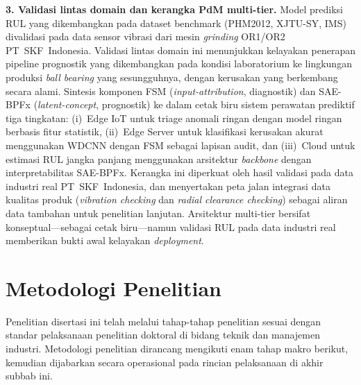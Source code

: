 \textbf{3. {\color{blue}Validasi lintas domain dan kerangka PdM multi-tier.}}
{\color{blue}Model prediksi RUL yang dikembangkan pada dataset benchmark
(PHM2012, XJTU-SY, IMS) divalidasi pada data sensor vibrasi dari mesin
\emph{grinding} OR1/OR2 PT~SKF~Indonesia.
Validasi lintas domain ini menunjukkan kelayakan penerapan pipeline prognostik
yang dikembangkan pada kondisi laboratorium ke lingkungan produksi
\emph{ball bearing} yang sesungguhnya, dengan kerusakan yang berkembang
secara alami.}
Sintesis komponen FSM (\emph{input-attribution}, {\color{blue}diagnostik}) dan SAE-BPFx
(\emph{latent-concept}, {\color{blue}prognostik}) ke dalam cetak biru sistem perawatan
prediktif tiga tingkatan: (i)~Edge IoT untuk triage anomali ringan dengan
model ringan berbasis fitur statistik, (ii)~Edge Server untuk klasifikasi
kerusakan akurat menggunakan WDCNN dengan FSM sebagai lapisan audit, dan
(iii)~Cloud untuk estimasi RUL jangka panjang menggunakan arsitektur
\emph{backbone} dengan interpretabilitas SAE-BPFx.
{\color{blue}Kerangka ini diperkuat oleh hasil validasi pada data
industri real PT~SKF~Indonesia, dan menyertakan peta jalan integrasi data
kualitas produk (\emph{vibration checking} dan \emph{radial clearance
checking}) sebagai aliran data tambahan untuk penelitian lanjutan.}
Arsitektur multi-tier bersifat konseptual---sebagai cetak biru---namun
validasi RUL pada data industri real memberikan bukti awal kelayakan
\emph{deployment}.


\section{Metodologi Penelitian}
\label{sec:bab1_metodologi}

Penelitian disertasi ini telah melalui tahap-tahap penelitian sesuai
dengan standar pelaksanaan penelitian doktoral di bidang {\color{blue}teknik
dan manajemen industri}.
Metodologi penelitian dirancang mengikuti enam tahap makro berikut,
kemudian dijabarkan secara operasional pada rincian pelaksanaan di akhir
subbab ini.

